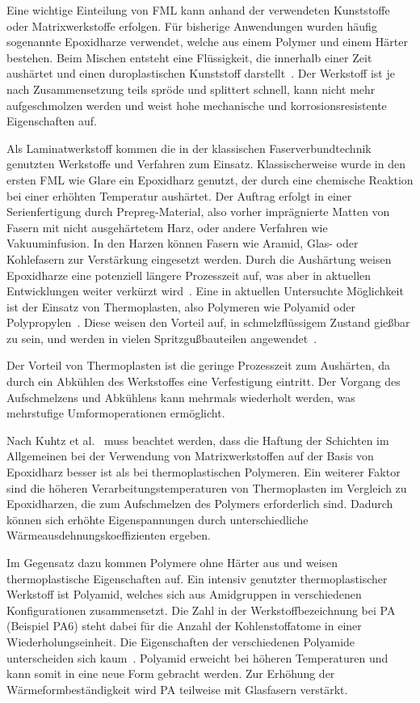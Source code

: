 
Eine wichtige Einteilung von FML kann anhand der verwendeten Kunststoffe oder Matrixwerkstoffe erfolgen.
Für bisherige Anwendungen wurden häufig sogenannte Epoxidharze verwendet, welche aus einem Polymer und einem Härter bestehen.
Beim Mischen entsteht eine Flüssigkeit, die innerhalb einer Zeit aushärtet und einen duroplastischen Kunststoff darstellt~\cite{Dornbusch.2015}.
Der Werkstoff ist je nach Zusammensetzung teils spröde und splittert schnell, kann nicht mehr aufgeschmolzen werden und weist hohe mechanische und korrosionsresistente Eigenschaften auf.

Als Laminatwerkstoff kommen die in der klassischen Faserverbundtechnik genutzten Werkstoffe und Verfahren zum Einsatz.
Klassischerweise wurde in den ersten FML wie Glare ein Epoxidharz genutzt, der durch eine chemische Reaktion bei einer erhöhten Temperatur aushärtet.
Der Auftrag erfolgt in einer Serienfertigung durch Prepreg-Material, also vorher imprägnierte Matten von Fasern mit nicht ausgehärtetem Harz, oder andere Verfahren wie Vakuuminfusion.
In den Harzen können Fasern wie Aramid, Glas- oder Kohlefasern zur Verstärkung eingesetzt werden.
Durch die Aushärtung weisen Epoxidharze eine potenziell längere Prozesszeit auf, was aber in aktuellen Entwicklungen weiter verkürzt wird~\cite{Lakho.2017}.
Eine in aktuellen Untersuchte Möglichkeit ist der Einsatz von Thermoplasten, also Polymeren wie Polyamid oder Polypropylen~\cite{Flock.b}.
Diese weisen den Vorteil auf, in schmelzflüssigem Zustand gießbar zu sein, und werden in vielen Spritzgußbauteilen angewendet~\cite{ehrenstein.2003}.

Der Vorteil von Thermoplasten ist die geringe Prozesszeit zum Aushärten, da durch ein Abkühlen des Werkstoffes eine Verfestigung eintritt.
Der Vorgang des Aufschmelzens und Abkühlens kann mehrmals wiederholt werden, was mehrstufige Umformoperationen ermöglicht.

Nach Kuhtz et al.~\cite{Kuhtz.2019} muss beachtet werden, dass die Haftung der Schichten im Allgemeinen bei der Verwendung von Matrixwerkstoffen auf der Basis von Epoxidharz besser ist als bei thermoplastischen Polymeren.
Ein weiterer Faktor sind die höheren Verarbeitungstemperaturen von Thermoplasten im Vergleich zu Epoxidharzen, die zum Aufschmelzen des Polymers erforderlich sind.
Dadurch können sich erhöhte Eigenspannungen durch unterschiedliche Wärmeausdehnungskoeffizienten ergeben.

Im Gegensatz dazu kommen Polymere ohne Härter aus und weisen thermoplastische Eigenschaften auf.
Ein intensiv genutzter thermoplastischer Werkstoff ist Polyamid, welches sich aus Amidgruppen in verschiedenen Konfigurationen zusammensetzt.
Die Zahl in der Werkstoffbezeichnung bei PA (Beispiel PA6) steht dabei für die Anzahl der Kohlenstoffatome in einer Wiederholungseinheit.
Die Eigenschaften der verschiedenen Polyamide unterscheiden sich kaum~\cite{Flock.b}.
Polyamid erweicht bei höheren Temperaturen und kann somit in eine neue Form gebracht werden.
Zur Erhöhung der Wärmeformbeständigkeit wird PA teilweise mit Glasfasern verstärkt.~\cite{Baur.2007}

